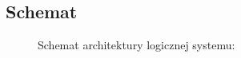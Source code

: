     \subsection{Schemat}
    \begin{figure}[H]
        \centering
        \caption{Schemat architektury logicznej systemu:}
        \label{fig:ISO42010_DIAGRAM}
    \end{figure}